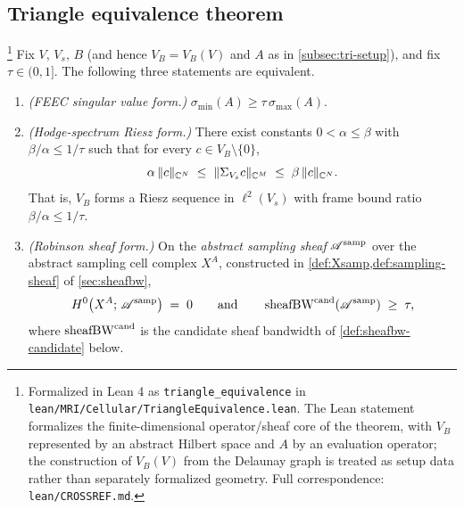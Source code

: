 \subsection{Triangle equivalence theorem}\label{subsec:tri-theorem}

\begin{theorem}\label{thm:triangle-equiv}\footnote{Formalized in Lean 4 as \texttt{triangle\_equivalence} in \texttt{lean/MRI/Cellular/TriangleEquivalence.lean}. The Lean statement formalizes the finite-dimensional operator/sheaf core of the theorem, with $V_B$ represented by an abstract Hilbert space and $A$ by an evaluation operator; the construction of $V_B(V)$ from the Delaunay graph is treated as setup data rather than separately formalized geometry. Full correspondence: \texttt{lean/CROSSREF.md}.}
Fix $V$, $V_s$, $B$ (and hence $V_B = V_B(V)$ and $A$ as in
\cref{subsec:tri-setup}), and fix $\tau \in (0, 1]$. The following
three statements are equivalent.
\begin{enumerate}
  \item[\textup{(a)}] \emph{(FEEC singular value form.)}
        $\sigma_{\min}(A) \ge \tau \, \sigma_{\max}(A)$.
  \item[\textup{(b)}] \emph{(Hodge-spectrum Riesz form.)} There exist
        constants $0 < \alpha \le \beta$ with $\beta / \alpha \le 1/\tau$
        such that for every $c \in V_B \setminus \{0\}$,
        \begin{equation}\label{eq:riesz}
          \alpha \,\lVert c \rVert_{\mathbb{C}^N}
          \;\le\;
          \lVert \Sigma_{V_s} c \rVert_{\mathbb{C}^M}
          \;\le\;
          \beta \,\lVert c \rVert_{\mathbb{C}^N}.
        \end{equation}
        That is, $V_B$ forms a Riesz sequence in $\ell^2(V_s)$ with
        frame bound ratio $\beta / \alpha \le 1/\tau$.
  \item[\textup{(c)}] \emph{(Robinson sheaf form.)} On the
        \emph{abstract sampling sheaf} $\mathscr{A}^{\mathrm{samp}}$ over the abstract
        sampling cell complex $X^A$, constructed in
        \cref{def:Xsamp,def:sampling-sheaf} of \cref{sec:sheafbw},
        \begin{equation}\label{eq:robinson-sheaf-form}
          H^0\!\left( X^A;\, \mathscr{A}^{\mathrm{samp}} \right) \;=\; 0
          \qquad \text{and} \qquad
          \operatorname{sheafBW}^{\mathrm{cand}}\!\left( \mathscr{A}^{\mathrm{samp}} \right)
          \;\ge\; \tau,
        \end{equation}
        where $\operatorname{sheafBW}^{\mathrm{cand}}$ is the candidate sheaf
        bandwidth of \cref{def:sheafbw-candidate} below.
\end{enumerate}
\end{theorem}


